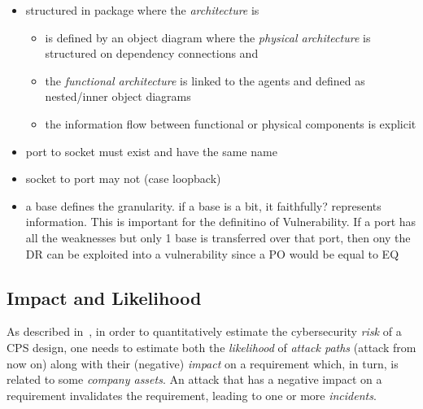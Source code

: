 \begin{itemize}
\item structured in package where the \emph{architecture} is
\begin{itemize}
\item is defined by an object diagram where the \emph{physical architecture} is structured on dependency connections and
\item the \emph{functional architecture} is linked to the agents and defined as nested/inner object diagrams
\item the information flow between functional or physical components is explicit 
\end{itemize}
\item port to socket must exist and have the same name
\item socket to port may not (case loopback)
\item a base defines the granularity. if a base is a bit, it faithfully? represents information. This is important 
	for the definitino of Vulnerability. If a port has all the weaknesses but only 1 base is transferred over that port,
		then ony the DR can be exploited into a vulnerability since a PO would be equal to EQ
\end{itemize}

\subsection{Impact and Likelihood}\label{sec:impact}
As described in~\autocite{CORASMethod}, in order to quantitatively estimate the
cybersecurity \emph{risk} of a CPS design, one needs to estimate both the
\emph{likelihood} of \emph{attack paths} (attack from now on) along with their (negative) \emph{impact} on a requirement which, in
turn, is related to some \emph{company assets}. An attack that has a negative impact
on a requirement invalidates the requirement, leading to one or more \emph{incidents}.
